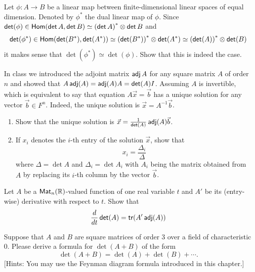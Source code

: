 \begin{problem}
  Let $\phi : A \to B$ be a linear map between finite-dimensional linear spaces of equal dimension. Denoted by $\phi^*$ the dual linear map of $\phi$. Since $\det(\phi) \in \Hom(\det A, \det B) \simeq {(\det A)}^* \otimes \det B$ and 
  \[
    \det(\phi^*) \in \Hom(\det(B^*), \det(A^*)) \simeq {(\det(B^*))}^* \otimes \det(A^*) \simeq {(\det(A))}^* \otimes \det(B)
  \]
  it makes sense that $\det(\phi^*) \simeq \det(\phi)$. Show that this is indeed the case. 
\end{problem}

\begin{problem}
  In class we introduced the adjoint matrix $\adj A$ for any square matrix $A$ of order $n$ and showed that $A \adj(A) = \adj(A) A = \det(A) I$. Assuming $A$ is invertible, which is equivalent to say that equation $A\vec{x} = \vec{b}$ has a unique solution for any vector $\vec{b} \in F^n$. Indeed, the unique solution is $\vec{x} = A^{-1} \vec{b}$.
  \begin{enumerate}
    \item Show that the unique solution is $\vec{x} = \frac{1}{\det(A)} \adj(A) \vec{b}$.
    \item If $x_i$ denotes the $i$-th entry of the solution $\vec{x}$, show that
    \[
      x_i = \frac{\Delta_i}{\Delta}
    \]
    where $\Delta = \det A$ and $\Delta_i = \det A_i$ with $A_i$ being the matrix obtained from $A$ by replacing its $i$-th column by the vector $\vec{b}$.
  \end{enumerate}
\end{problem}

\begin{problem}
  Let $A$ be a $\Mat_n(\R)$-valued function of one real variable $t$ and $A'$ be its (entry-wise) derivative with respect to $t$. Show that
  \[
    \frac{d}{dt} \det(A) = \tr(A' \adj(A))
  \]
\end{problem}

\begin{problem}
  Suppose that $A$ and $B$ are square matrices of order 3 over a field of characteristic 0. Please derive a formula for $\det(A + B)$ of the form
  \[
    \det(A + B) = \det(A) + \det(B) + \cdots.
  \]
  [Hints: You may use the Feynman diagram formula introduced in this chapter.]
\end{problem}